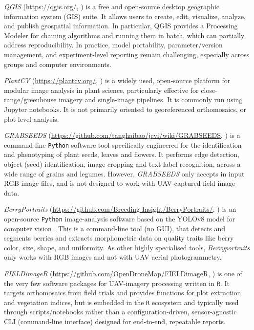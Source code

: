 \documentclass[drones,technicalnote,accept,pdftex,moreauthors]{Definitions/mdpi}
\begin{document}
\textit{QGIS} (\url{https://qgis.org/}, \cite{moyroud2018introduction}) is a free and open-source desktop geographic information system (GIS) suite. It allows users to create, edit, visualize, analyze, and publish geospatial information. In particular, QGIS provides a Processing Modeler \cite{dobesova2020evaluation} for chaining algorithms and running them in batch, which can partially address reproducibility. In practice, model portability, parameter/version management, and experiment-level reporting remain challenging, especially across groups and computer environments.

\textit{PlantCV} (\url{https://plantcv.org/}, \cite{noauthor_plantcv_2021}) is a widely used, open-source platform for modular image analysis in plant science, particularly effective for close-range/greenhouse imagery and single-image pipelines. It is commonly run using Jupyter notebooks. It is not primarily oriented to georeferenced orthomosaics,  or plot-level analysis.

\textit{GRABSEEDS} (\url{https://github.com/tanghaibao/jcvi/wiki/GRABSEEDS}, \cite{tang2024grabseeds}) is a command-line \texttt{Python} software tool specifically engineered for the identification and phenotyping of plant seeds, leaves and flowers.
It performs edge detection, object (seed) identification, image cropping and text label recognition, across a wide range of grains and legumes.
However, \textit{GRABSEEDS} only accepts in input RGB image files, and is not designed to work with UAV-captured field image data.

\textit{BerryPortraits} (\url{https://github.com/Breeding-Insight/BerryPortraits/}, \cite{loarca2024berryportraits}) is an open-source \texttt{Python} image-analysis software based on the YOLOv8 model for computer vision \cite{varghese2024yolov8}. 
This is a command-line tool (no GUI), that detects and segments berries and extracts morphometric data on quality traits like berry color, size, shape, and uniformity. 
As other highly specialised tools, \textit{Berryportraits} only works with RGB images and not with UAV aerial photogrammetry.

\textit{FIELDimageR} (\url{https://github.com/OpenDroneMap/FIELDimageR}, \cite{matias_fieldimager_2020}) is one of the very few software packages for UAV-imagery processing written in \texttt{R}. It targets orthomosaics from field trials and provides functions for plot extraction and vegetation indices, but is embedded in the \texttt{R} ecosystem and typically used through scripts/notebooks rather than a configuration-driven, sensor-agnostic CLI (command-line interface) designed for end-to-end, repeatable reports.
\end{document}
